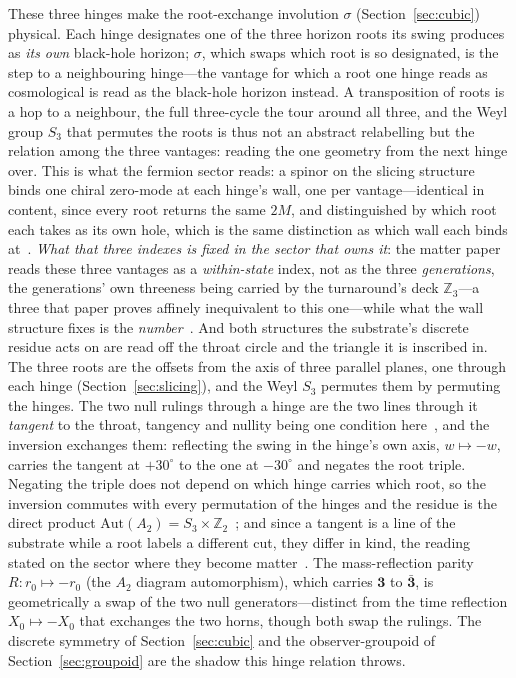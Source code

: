 \documentclass[11pt,a4paper]{article}
\theoremstyle{definition}
\begin{document}
These three hinges make the root-exchange involution $\sigma$ (Section~\ref{sec:cubic}) physical. Each hinge designates one of the three horizon roots its swing produces as \emph{its own} black-hole horizon; $\sigma$, which swaps which root is so designated, is the step to a neighbouring hinge---the vantage for which a root one hinge reads as cosmological is read as the black-hole horizon instead. A transposition of roots is a hop to a neighbour, the full three-cycle the tour around all three, and the Weyl group $S_{3}$ that permutes the roots is thus not an abstract relabelling but the relation among the three vantages: reading the one geometry from the next hinge over. This is what the fermion sector reads: a spinor on the slicing structure binds one chiral zero-mode at each hinge's wall, one per vantage---identical in content, since every root returns the same $2M$, and distinguished by which root each takes as its own hole, which is the same distinction as which wall each binds at~\cite{JanzenMatter}. \emph{What that three indexes is fixed in the sector that owns it}: the matter paper reads these three vantages as a \emph{within-state} index, not as the three \emph{generations}, the generations' own threeness being carried by the turnaround's deck $\mathbb{Z}_{3}$---a three that paper proves affinely inequivalent to this one---while what the wall structure fixes is the \emph{number}~\cite{JanzenMatter}. And both structures the substrate's discrete residue acts on are read off the throat circle and the triangle it is inscribed in. The three roots are the offsets from the axis of three parallel planes, one through each hinge (Section~\ref{sec:slicing}), and the Weyl $S_{3}$ permutes them by permuting the hinges. The two null rulings through a hinge are the two lines through it \emph{tangent} to the throat, tangency and nullity being one condition here~\cite{JanzenGeometricCore}, and the inversion exchanges them: reflecting the swing in the hinge's own axis, $w\mapsto-w$, carries the tangent at $+30^{\circ}$ to the one at $-30^{\circ}$ and negates the root triple. Negating the triple does not depend on which hinge carries which root, so the inversion commutes with every permutation of the hinges and the residue is the direct product $\mathrm{Aut}(A_{2})=S_{3}\times\mathbb{Z}_{2}$~\cite{JanzenAlgebroid}; and since a tangent is a line of the substrate while a root labels a different cut, they differ in kind, the reading stated on the sector where they become matter~\cite{JanzenMatter}. The mass-reflection parity $R:r_{0}\mapsto-r_{0}$ (the $A_{2}$ diagram automorphism), which carries $\mathbf 3$ to $\bar{\mathbf 3}$, is geometrically a swap of the two null generators---distinct from the time reflection $X_{0}\mapsto-X_{0}$ that exchanges the two horns, though both swap the rulings. The discrete symmetry of Section~\ref{sec:cubic} and the observer-groupoid of Section~\ref{sec:groupoid} are the shadow this hinge relation throws.
\end{document}
